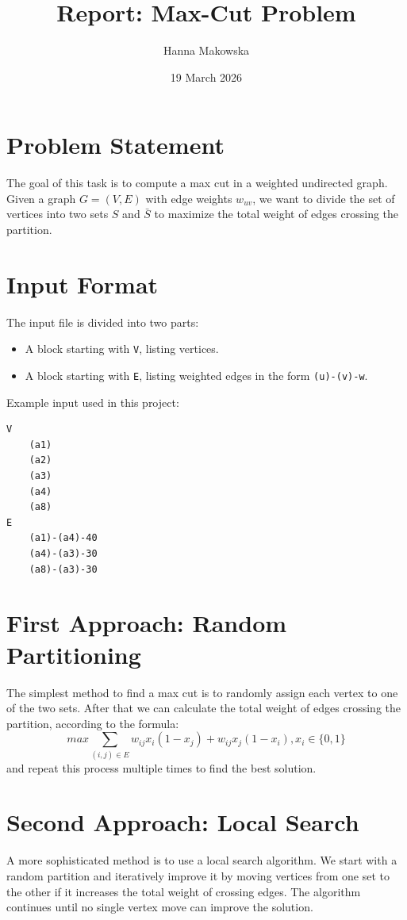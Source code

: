 \documentclass[12pt,a4paper]{article}
\title{Report: Max-Cut Problem}
\author{Hanna Makowska}
\date{19 March 2026}
\begin{document}
\maketitle

\section{Problem Statement}
The goal of this task is to compute a max cut in a weighted undirected graph.
Given a graph $G=(V,E)$ with edge weights $w_{uv}$, we want to divide the set of
vertices into two sets $S$ and $\bar{S}$ to maximize the total weight of edges
crossing the partition.

\section{Input Format}
The input file is divided into two parts:
\begin{itemize}
    \item A block starting with \texttt{V}, listing vertices.
    \item A block starting with \texttt{E}, listing weighted edges in the form
          \texttt{(u)-(v)-w}.
\end{itemize}

Example input used in this project:
\begin{verbatim}
V
    (a1)
    (a2)
    (a3)
    (a4)
    (a8)
E
    (a1)-(a4)-40
    (a4)-(a3)-30
    (a8)-(a3)-30
\end{verbatim}

\section{First Approach: Random Partitioning}
The simplest method to find a max cut is to randomly assign each vertex to one of the two sets.
After that we can calculate the total weight of edges crossing the partition, according to the formula:
\[
    max \sum_{(i, j) \in E} w_{ij} x_{i} (1 - x_{j}) + w_{ij} x_{j} (1 - x_{i}),x_{i} \in \{0, 1\}
\]
and repeat this
process multiple times to find the best solution.

\section{Second Approach: Local Search}
A more sophisticated method is to use a local search algorithm. We start with a random partition and
iteratively improve it by moving vertices from one set to the other if it increases the total weight
of crossing edges. The algorithm continues until no single vertex move can improve the solution.
\end{document}
